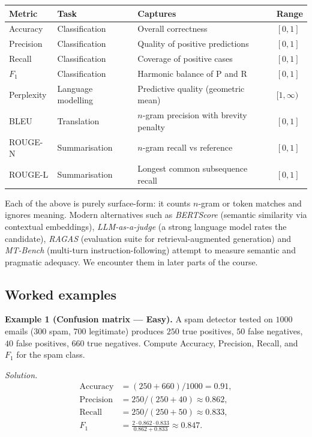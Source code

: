 \begin{center}
\begin{tabular}{|l|l|l|l|}
\hline
\textbf{Metric} & \textbf{Task} & \textbf{Captures} & \textbf{Range} \\
\hline
Accuracy & Classification & Overall correctness & $[0, 1]$ \\
Precision & Classification & Quality of positive predictions & $[0, 1]$ \\
Recall & Classification & Coverage of positive cases & $[0, 1]$ \\
$F_1$ & Classification & Harmonic balance of P and R & $[0, 1]$ \\
Perplexity & Language modelling & Predictive quality (geometric mean) & $[1, \infty)$ \\
BLEU & Translation & $n$-gram precision with brevity penalty & $[0, 1]$ \\
ROUGE-N & Summarisation & $n$-gram recall vs reference & $[0, 1]$ \\
ROUGE-L & Summarisation & Longest common subsequence recall & $[0, 1]$ \\
\hline
\end{tabular}
\end{center}

\begin{remark}
Each of the above is purely surface-form: it counts $n$-gram or token matches and ignores meaning. Modern alternatives such as \emph{BERTScore} (semantic similarity via contextual embeddings), \emph{LLM-as-a-judge} (a strong language model rates the candidate), \emph{RAGAS} (evaluation suite for retrieval-augmented generation) and \emph{MT-Bench} (multi-turn instruction-following) attempt to measure semantic and pragmatic adequacy. We encounter them in later parts of the course.
\end{remark}

\subsection{Worked examples}

\textbf{Example 1 (Confusion matrix --- Easy).}
A spam detector tested on $1000$ emails ($300$ spam, $700$ legitimate) produces $250$ true positives, $50$ false negatives, $40$ false positives, $660$ true negatives. Compute Accuracy, Precision, Recall, and $F_1$ for the spam class.

\textit{Solution.}
\begin{align*}
\mathrm{Accuracy} &= (250 + 660) / 1000 = 0.91, \\
\mathrm{Precision} &= 250 / (250 + 40) \approx 0.862, \\
\mathrm{Recall} &= 250 / (250 + 50) \approx 0.833, \\
F_1 &= \frac{2 \cdot 0.862 \cdot 0.833}{0.862 + 0.833} \approx 0.847.
\end{align*}

